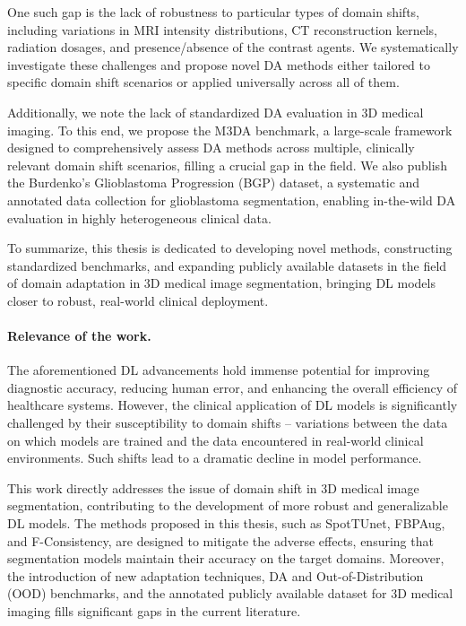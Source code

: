One such gap is the lack of robustness to particular types of domain shifts, including variations in MRI intensity distributions, CT reconstruction kernels, radiation dosages, and presence/absence of the contrast agents. We systematically investigate these challenges and propose novel DA methods either tailored to specific domain shift scenarios or applied universally across all of them.

Additionally, we note the lack of standardized DA evaluation in 3D medical imaging. To this end, we propose the M3DA benchmark, a large-scale framework designed to comprehensively assess DA methods across multiple, clinically relevant domain shift scenarios, filling a crucial gap in the field. We also publish the Burdenko's Glioblastoma Progression (BGP) dataset, a systematic and annotated data collection for glioblastoma segmentation, enabling in-the-wild DA evaluation in highly heterogeneous clinical data.

To summarize, this thesis is dedicated to developing novel methods, constructing standardized benchmarks, and expanding publicly available datasets in the field of domain adaptation in 3D medical image segmentation, bringing DL models closer to robust, real-world clinical deployment.


\paragraph{Relevance of the work.}


The aforementioned DL advancements hold immense potential for improving diagnostic accuracy, reducing human error, and enhancing the overall efficiency of healthcare systems. However, the clinical application of DL models is significantly challenged by their susceptibility to domain shifts -- variations between the data on which models are trained and the data encountered in real-world clinical environments. Such shifts lead to a dramatic decline in model performance.

This work directly addresses the issue of domain shift in 3D medical image segmentation, contributing to the development of more robust and generalizable DL models. The methods proposed in this thesis, such as SpotTUnet, FBPAug, and F-Consistency, are designed to mitigate the adverse effects, ensuring that segmentation models maintain their accuracy on the target domains. Moreover, the introduction of new adaptation techniques, DA and Out-of-Distribution (OOD) benchmarks, and the annotated publicly available dataset for 3D medical imaging fills significant gaps in the current literature.



